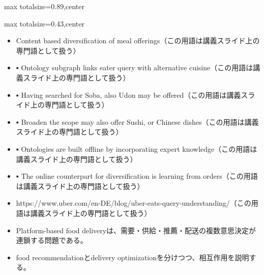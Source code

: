 \begin{minipage}[t]{0.58\textwidth}
\begin{adjustbox}{max totalsize={\textwidth}{0.89\textheight},center}
\begin{minipage}{\textwidth}
\end{minipage}
\end{adjustbox}
\end{minipage}


\clearpage
{}
\begin{minipage}[t]{0.405\textwidth}
\begin{adjustbox}{max totalsize={\textwidth}{0.43\textheight},center}
\begin{minipage}{\textwidth}\scriptsize
{}\begin{itemize}
\item Content based diversification of meal offerings（この用語は講義スライド上の専門語として扱う）
\item ▪ Ontology subgraph links eater query with alternative cuisine（この用語は講義スライド上の専門語として扱う）
\item ▪ Having searched for Soba, also Udon may be offered（この用語は講義スライド上の専門語として扱う）
\item ▪ Broaden the scope may also offer Sushi, or Chinese dishes（この用語は講義スライド上の専門語として扱う）
\item ▪ Ontologies are built offline by incorporating expert knowledge（この用語は講義スライド上の専門語として扱う）
\item ▪ The online counterpart for diversification is learning from orders（この用語は講義スライド上の専門語として扱う）
\item https://www.uber.com/en-DE/blog/uber-eats-query-understanding/（この用語は講義スライド上の専門語として扱う）
\end{itemize}\begin{itemize}
\item Platform-based food deliveryは、需要・供給・推薦・配送の複数意思決定が連鎖する問題である。
\item food recommendationとdelivery optimizationを分けつつ、相互作用を説明する。
\end{itemize}
\end{minipage}
\end{adjustbox}
\end{minipage}\hfill
